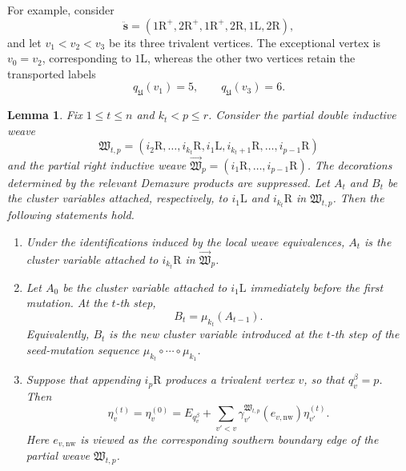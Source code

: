 \documentclass[12pt, reqno]{amsart}
\theoremstyle{plain}
\newtheorem{lemma}[theorem]{Lemma}
\theoremstyle{definition}
\numberwithin{equation}{section}
\begin{document}
For example, consider
\[
    \ddot{\mathbf s}
    =
    (1\mathrm R^+,2\mathrm R^+,1\mathrm R^+,
      2\mathrm R,1\mathrm L,2\mathrm R),
\]
and let \(v_1<v_2<v_3\) be its three trivalent vertices. The
exceptional vertex is \(v_0=v_2\), corresponding to
\(1\mathrm L\), whereas the other two vertices retain the transported
labels
\[
    q_{\mathfrak U}(v_1)=5,
    \qquad
    q_{\mathfrak U}(v_3)=6.
\]
\begin{lemma}\label{lem:partial-eta}
Fix \(1\leq t\leq n\) and \(k_t<p\leq r\). Consider the partial
double inductive weave
\begin{equation}\label{eq:partial-double-inductive-weave}
    \mathfrak W_{t,p}
    =(i_2\mathrm R,\ldots,i_{k_t}\mathrm R,
      i_1\mathrm L,
      i_{k_t+1}\mathrm R,\ldots,i_{p-1}\mathrm R)
\end{equation}
and the partial right inductive weave
\(\overrightarrow{\mathfrak W}_p
=(i_1\mathrm R,\ldots,i_{p-1}\mathrm R)\). The decorations
determined by the relevant Demazure products are suppressed. Let
\(A_t\) and \(B_t\) be the cluster variables attached, respectively,
to \(i_1\mathrm L\) and \(i_{k_t}\mathrm R\) in
\(\mathfrak W_{t,p}\). Then the following statements hold.

\begin{enumerate}[label=\textup{(\arabic*)}]
    \item Under the identifications induced by the local weave
    equivalences, \(A_t\) is the cluster variable attached to
    \(i_{k_t}\mathrm R\) in
    \(\overrightarrow{\mathfrak W}_p\).

    \item Let \(A_0\) be the cluster variable attached to
    \(i_1\mathrm L\) immediately before the first mutation. At the
    \(t\)-th step,
    \begin{equation}\label{eq:Bt-mutation-At-minus-one}
        B_t=\mu_{k_t}(A_{t-1}).
    \end{equation}
    Equivalently, \(B_t\) is the new cluster variable introduced at
    the \(t\)-th step of the seed-mutation sequence
    \(\mu_{k_t}\circ\cdots\circ\mu_{k_1}\).

    \item Suppose that appending \(i_p\mathrm R\) produces a
    trivalent vertex \(v\), so that \(q_v^\beta=p\). Then
    \begin{equation}\label{eq:partial-eta-recursion}
        \eta_v^{(t)}=\eta_v^{(0)}
        =E_{q_v^\beta}+
        \sum_{v'<v}
        \gamma_{v'}^{\mathfrak W_{t,p}}
            (e_{v,\mathrm{nw}})\eta_{v'}^{(t)}.
    \end{equation}
    Here \(e_{v,\mathrm{nw}}\) is viewed as the corresponding
    southern boundary edge of the partial weave
    \(\mathfrak W_{t,p}\).
\end{enumerate}
\end{lemma}
\end{document}
